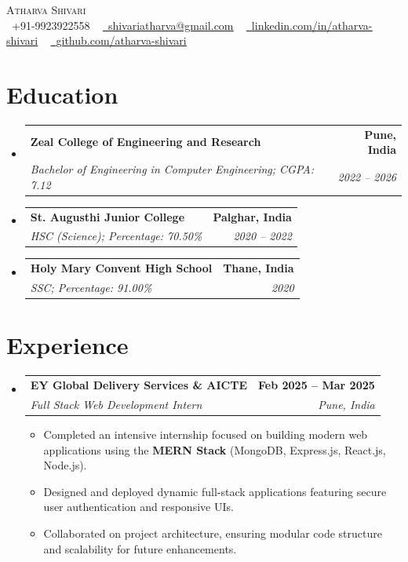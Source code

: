 \documentclass[letterpaper,11pt]{article}
\makeatletter
\newcommand{\resumeItem}[1]{
  \item\small{
    {#1 \vspace{-2pt}}
  }
}
\newcommand{\resumeSubheading}[4]{
  \vspace{-2pt}\item
    \begin{tabular*}{1.0\textwidth}[t]{l@{\extracolsep{\fill}}r}
      \textbf{#1} & \textbf{\small #2} \\
      \textit{\small#3} & \textit{\small #4} \\
    \end{tabular*}\vspace{-7pt}
}
\newcommand{\resumeSubHeadingListStart}{\begin{itemize}[leftmargin=0.0in, label={}]}
\newcommand{\resumeSubHeadingListEnd}{\end{itemize}}
\newcommand{\resumeItemListStart}{\begin{itemize}}
\newcommand{\resumeItemListEnd}{\end{itemize}\vspace{-5pt}}
\makeatother
\begin{document}
\begin{center}
    {\Huge \scshape Atharva Shivari} \\ \vspace{5pt}
    \small \raisebox{-0.1\height}\faPhone\ +91-9923922558 ~ 
    \href{mailto:shivariatharva@gmail.com}{\raisebox{-0.2\height}\faEnvelope\  \underline{shivariatharva@gmail.com}} ~ 
    \href{https://linkedin.com/in/atharva-shivari/}{\raisebox{-0.2\height}\faLinkedin\ \underline{linkedin.com/in/atharva-shivari}}  ~
    \href{https://github.com/atharvashivari}{\raisebox{-0.2\height}\faGithub\ \underline{github.com/atharva-shivari}}
    \vspace{-8pt}
\end{center}


\section{Education}
  \resumeSubHeadingListStart
    \resumeSubheading
      {Zeal College of Engineering and Research}{Pune, India}
      {Bachelor of Engineering in Computer Engineering; CGPA: 7.12}{2022 -- 2026}
    \resumeSubheading
      {St. Augusthi Junior College}{Palghar, India}
      {HSC (Science); Percentage: 70.50\%}{2020 -- 2022}
    \resumeSubheading
      {Holy Mary Convent High School}{Thane, India}
      {SSC; Percentage: 91.00\%}{2020}
  \resumeSubHeadingListEnd


\section{Experience}
  \resumeSubHeadingListStart

    \resumeSubheading
      {EY Global Delivery Services \& AICTE}{Feb 2025 -- Mar 2025}
      {Full Stack Web Development Intern}{Pune, India}
      \resumeItemListStart
        \resumeItem{Completed an intensive internship focused on building modern web applications using the \textbf{MERN Stack} (MongoDB, Express.js, React.js, Node.js).}
        \resumeItem{Designed and deployed dynamic full-stack applications featuring secure user authentication and responsive UIs.}
        \resumeItem{Collaborated on project architecture, ensuring modular code structure and scalability for future enhancements.}
      \resumeItemListEnd
      
  \resumeSubHeadingListEnd
\vspace{-12pt}
\end{document}
